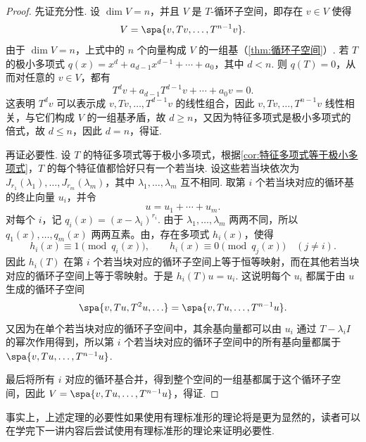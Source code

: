 \begin{proof}
    先证充分性. 设 $\dim V = n$，并且 $V$ 是 $T$-循环子空间，即存在 $v \in V$ 使得
    \[
        V=\spa\{v,Tv,\ldots,T^{n-1}v\}.
    \]
    由于 $\dim V = n$，上式中的 $n$ 个向量构成 $V$ 的一组基（\autoref{thm:循环子空间}）. 若 $T$ 的极小多项式 $q(x) = x^d + a_{d-1}x^{d-1} + \cdots + a_0$，其中 $d < n$. 则 $q(T) = 0$，从而对任意的 $v \in V$，都有
    \[T^d v + a_{d-1}T^{d-1} v + \cdots + a_0 v = 0.\]
    这表明 $T^d v$ 可以表示成 $v, Tv, \ldots, T^{d - 1}v$ 的线性组合，因此 $v, Tv, \ldots, T^{n - 1}v$ 线性相关，与它们构成 $V$ 的一组基矛盾，故 $d \geqslant n$，又因为特征多项式是极小多项式的倍式，故 $d \leqslant n$，因此 $d = n$，得证.

    再证必要性. 设 $T$ 的特征多项式等于极小多项式，根据\autoref{cor:特征多项式等于极小多项式}，$T$ 的每个特征值都恰好只有一个若当块. 设这些若当块依次为 $J_{r_1}(\lambda_1), \ldots, J_{r_m}(\lambda_m)$，其中 $\lambda_1, \ldots, \lambda_m$ 互不相同. 取第 $i$ 个若当块对应的循环基的终止向量 $u_i$，并令
    \[
        u = u_1 + \cdots + u_m.
    \]
    对每个 $i$，记 $q_i(x) = (x-\lambda_i)^{r_i}$. 由于 $\lambda_1, \ldots, \lambda_m$ 两两不同，所以 $q_1(x), \ldots, q_m(x)$ 两两互素。由，存在多项式 $h_i(x)$，使得
    \[ h_i(x) \equiv 1 \pmod{q_i(x)}, \qquad h_i(x)\equiv 0 \pmod{q_j(x)}\quad (j\neq i). \]
    因此 $h_i(T)$ 在第 $i$ 个若当块对应的循环子空间上等于恒等映射，而在其他若当块对应的循环子空间上等于零映射。于是 $h_i(T)u = u_i$. 这说明每个 $u_i$ 都属于由 $u$ 生成的循环子空间
    \[ \spa\{v, Tu, T^2u, \ldots\} = \spa\{v, Tu, \ldots, T^{n - 1}u\}. \]
    又因为在单个若当块对应的循环子空间中，其余基向量都可以由 $u_i$ 通过 $T - \lambda_i I$ 的幂次作用得到，所以第 $i$ 个若当块对应的循环子空间中的所有基向量都属于 $\spa\{v, Tu, \ldots, T^{n - 1}u\}$.

    最后将所有 $i$ 对应的循环基合并，得到整个空间的一组基都属于这个循环子空间，因此 $V = \spa\{v, Tu, \ldots, T^{n - 1}u\}$，得证.
\end{proof}

事实上，上述定理的必要性如果使用有理标准形的理论将是更为显然的，读者可以在学完下一讲内容后尝试使用有理标准形的理论来证明必要性.

\begin{summary}

\end{summary}

